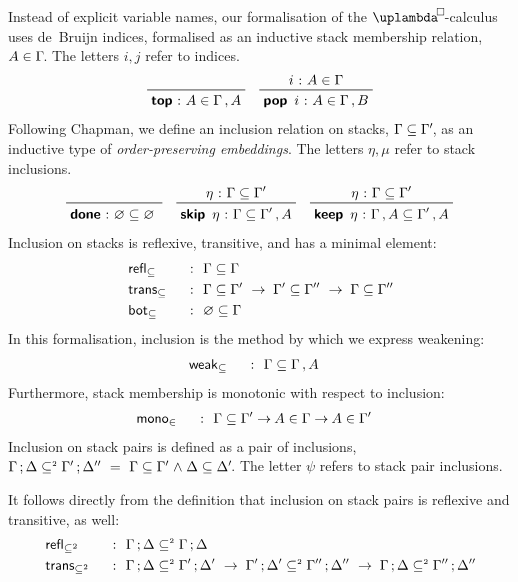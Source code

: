 \documentclass[submission,copyright,creativecommons,sharealike,backref=page]{eptcs}
\newcommand{\uplambdabox}{\uplambda^{\mkern-3mu\Box\mkern-3mu}}
\renewcommand{\leq}{\mathrel{\subseteq}}
\newcommand{\leqII}{\mathrel{\subseteq^{\scriptscriptstyle{2}}}}
\renewcommand{\:}{\mathop{\mkern3mu:\mkern3mu}}
\renewcommand{\.}{\mathop{\mkern3mu.\mkern3mu}}
\renewcommand{\;}{\mathop{;}}
\renewcommand{\,}{\mathop{,}}
\newcommand{\conj}{\mathrel{\wedge}}
\renewcommand{\r}{\mathrel{\rightarrow\mkern-1mu}}
\newcommand{\monoin}{\operatorname{\textsf{mono}_{\in}}}
\newcommand{\botleq}{\operatorname{\textsf{bot}_{\leq}}}
\newcommand{\weakleq}{\operatorname{\textsf{weak}_{\leq}}}
\newcommand{\reflleq}{\operatorname{\textsf{refl}_{\leq}}}
\newcommand{\reflleqII}{\operatorname{\textsf{refl}_{\leqII}}}
\newcommand{\transleq}{\operatorname{\textsf{trans}_{\leq}}}
\newcommand{\transleqII}{\operatorname{\textsf{trans}_{\leqII}}}
\renewcommand{\O}{\varnothing}
\newcommand{\donel}{\operatorname{\textsf{\textbf{done}}}}
\newcommand{\keepl}{\operatorname{\textsf{\textbf{keep}}}}
\newcommand{\skipl}{\operatorname{\textsf{\textbf{skip}}}}
\newcommand{\tops}{\operatorname{\textsf{\textbf{top}}}}
\newcommand{\pops}{\operatorname{\textsf{\textbf{pop}}}}
\theoremstyle{mystyle}
\begin{document}
Instead of explicit variable names, our formalisation of the $\uplambdabox$-calculus uses de~Bruijn indices, formalised as an inductive stack membership relation, $A \in \Gamma\mkern-3mu$.  The letters $i, j$ refer to indices.
\begin{align*}
  \prftree
    {}
    {\tops \: A \in \Gamma \, A}
  \quad
  \prftree
    {i \: A \in \Gamma}
    {\pops~i \: A \in \Gamma \, B}
\end{align*}
Following Chapman\cite{Chapman09}, we define an inclusion relation on stacks, $\Gamma \leq \Gamma'\mkern-3mu$, as an inductive type of \emph{order-preserving embeddings}.  The letters $\eta, \mu$ refer to stack inclusions.
\begin{align*}
  \prftree
    {}
    {\donel \: \O \leq \O \phantom{'}}
  \quad
  \prftree
    {\eta \: \Gamma \leq \Gamma'}
    {\skipl~\eta \: \Gamma \leq \Gamma' \, A}
  \quad
  \prftree
    {\eta \: \Gamma \leq \Gamma'}
    {\keepl~\eta \: \Gamma \, A \leq \Gamma' \, A}
\end{align*}
Inclusion on stacks is reflexive, transitive, and has a minimal element:
\begin{alignat*}{2}
  & \reflleq    && ~\:~ \Gamma \leq \Gamma\\
  & \transleq   && ~\:~ \Gamma \leq \Gamma' ~\r~ \Gamma' \leq \Gamma'' ~\r~ \Gamma \leq \Gamma''\\
  & \botleq     && ~\:~ \O \leq \Gamma
\end{alignat*}
In this formalisation, inclusion is the method by which we express weakening:
\begin{alignat*}{2}
  & \weakleq    && ~\:~ \Gamma \leq \Gamma \, A
\end{alignat*}
Furthermore, stack membership is monotonic with respect to inclusion:
\begin{alignat*}{2}
  & \monoin     && ~\:~ \Gamma \leq \Gamma' \r A \in \Gamma \r A \in \Gamma'
\end{alignat*}
Inclusion on stack pairs is defined as a pair of inclusions, $\Gamma \; \Delta \leqII \Gamma' \; \Delta'' ~=~ \Gamma \leq \Gamma' \conj \Delta \leq \Delta'\mkern-3mu$.  The letter $\psi$ refers to stack pair inclusions.

It follows directly from the definition that inclusion on stack pairs is reflexive and transitive, as well:
\begin{alignat*}{2}
  & \reflleqII  && ~\:~ \Gamma \; \Delta \leqII \Gamma \; \Delta\\
  & \transleqII && ~\:~ \Gamma \; \Delta \leqII \Gamma' \; \Delta' ~\r~ \Gamma' \; \Delta' \leqII \Gamma'' \; \Delta'' ~\r~ \Gamma \; \Delta \leqII \Gamma'' \; \Delta''
\end{alignat*}
\end{document}
